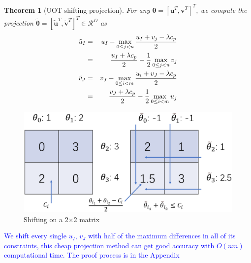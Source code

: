 \documentclass[twoside]{article}
\theoremstyle{plain}
\newtheorem{thm}{Theorem}
\newcommand{\tranT}{T}
\renewcommand{\vec}[1]{\bm{#1}}
\newcommand{\changeXS}[1]{\textcolor{blue}{#1}}
\begin{document}
\begin{thm}[UOT shifting projection]
\label{Thm:UOT_ShiftProjection}
For any $\vec{\theta} = [{\vec{u}}^{\tranT},{\vec{v}}^{\tranT}]^{\tranT}$, we compute the projection $\tilde{\vec{\theta}} = [\tilde{\vec{u}}^{\tranT},\tilde{\vec{v}}^{\tranT}]^{\tranT} \in \mathcal{R}^{D}$ as
\begin{eqnarray}
\tilde{{u}}_I &=& {{u}}_I - \max_{0\leq j < n} \frac{{{u}}_I +{{v}}_j - \lambda{c}_{p}}{2} \notag\\
& =& \frac{{{u}}_I +\lambda{c}_{p}}{2} - \frac{1}{2}\max_{0\leq j < n} {{v}}_j\\
\tilde{{v}}_J &=& {{v}}_J - \max_{0 \leq i < m} \frac{{{u}}_i +{{v}}_J - \lambda{c}_{p}}{2}\notag\\
& =& \frac{{{v}}_J +\lambda{c}_{p}}{2} - \frac{1}{2}\max_{0 \leq i < m} {{u}}_j
 \label{eq:uotproj}
\end{eqnarray}
\end{thm}
	\begin{figure}[h]
	\begin{center}	
	\includegraphics[width = \linewidth]{pic/shifting}
	\caption{Shifting on a 2$\times$2 matrix}
	\end{center}	
	\end{figure}

\changeXS{We shift every single $u_I$, $v_J$ with half of the maximum differences in all of its constraints, this cheap projection method can get good accuracy with $O(nm)$ computational time. The proof process is in the Appendix}
%
\end{document}
